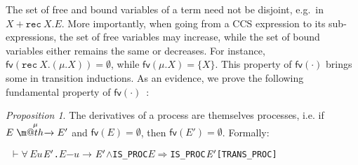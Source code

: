 \documentclass[GCNS]{yincog}
\makeatletter
\renewcommand{\HOLConst}[1]{\texttt{#1}}
\renewcommand{\HOLBoundVar}[1]{\ensuremath{\mathit{#1}}}
\renewcommand{\HOLSymConst}[1]{#1}
\renewcommand{\HOLTokenConj}{\ensuremath{\wedge}}
\def \rightarrowfill{$\m@th\mathord{\smash-}\mkern-6mu%
  \cleaders\hbox{$\mkern-2mu\mathord{\smash-}\mkern-2mu$}\hfill
  \mkern-6mu\mathord\rightarrow$}
\renewcommand{\HOLTokenForall}{\ensuremath{\forall \,}}
\renewcommand{\HOLTokenTurnstile}{\ensuremath{\:\:\vdash}}
\theoremstyle{remark}
\theoremstyle{theorem}
\newtheorem{proposition}[definition]{Proposition}
\theoremstyle{remark}
\newcommand{\HOLTokenTransBegin}{$-$}
\newcommand{\HOLTokenTransEnd}{$\rightarrow$\xspace}
\renewcommand{\HOLTokenImp}{\ensuremath{\Longrightarrow}}
\def\fvvtex#1{\rmsf{fv}(#1)}
\newcommand{\arr}[1]{\mathrel{\stackrel{{\;\;#1\;\;}}{\mbox{\rightarrowfill}}}}
\newcommand{\rmsf}[1]{{\mathsf{{#1}}}}
\newcommand{\recu}[2]{\mathtt{rec}\: #1 . #2}
\makeatother
\begin{document}
The set of free and bound variables of a term need not be disjoint, e.g.~in
$X + \recu X E$. More importantly, when going from a CCS expression to
its sub-expressions, the set of free variables may increase, while the
set of bound variables either remains the same or decreases. For instance,
$\fvvtex{\recu X (\mu .X)} = \emptyset $, while
$\fvvtex{\mu .X} = \{X\}$. This property of $\fvvtex{\cdot}$ brings some
 in transition inductions. As an evidence, we prove the following
fundamental property of $\fvvtex{\cdot}$~\citep[p.~1209]{milner1990operational}:
%
\begin{proposition}
 \label{prop:transFV}
The derivatives of a process are themselves processes, i.e. if
$E \arr{\mu} E'$ and $\fvvtex{E} = \emptyset $, then
$\fvvtex{E'} = \emptyset $. Formally:
%
\begin{alltt}
\HOLTokenTurnstile{} \HOLSymConst{\HOLTokenForall{}}\HOLBoundVar{E} \HOLBoundVar{u} \ensuremath{\HOLBoundVar{E}\sp{\prime}}. \HOLBoundVar{E} \HOLTokenTransBegin\HOLBoundVar{u}\HOLTokenTransEnd \ensuremath{\HOLBoundVar{E}\sp{\prime}} \HOLSymConst{\HOLTokenConj{}} \HOLConst{IS\_PROC} \HOLBoundVar{E} \HOLSymConst{\HOLTokenImp{}} \HOLConst{IS\_PROC} \ensuremath{\HOLBoundVar{E}\sp{\prime}}\hfill{[TRANS\_PROC]}
\end{alltt}
%
\end{proposition}
\end{document}
